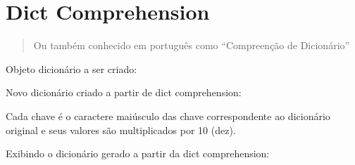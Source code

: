 \documentclass[letterpaper,10pt,brazil]{sphinxmanual}
\begin{document}
\section{Dict Comprehension}
\label{\detokenize{content/sequences:dict-comprehension}}\begin{quote}

Ou também conhecido em português como “Compreenção de Dicionário”
\end{quote}

Objeto dicionário a ser criado:

\begin{sphinxVerbatim}[commandchars=\\\{\}]
      
\end{sphinxVerbatim}

Novo dicionário criado a partir de dict comprehension:

\begin{sphinxVerbatim}[commandchars=\\\{\}]
          
\end{sphinxVerbatim}

Cada chave é o caractere maiúsculo das chave correspondente ao dicionário
original e seus valores são multiplicados por 10 (dez).

Exibindo o dicionário gerado a partir da dict comprehension:

\begin{sphinxVerbatim}[commandchars=\\\{\}]
\end{sphinxVerbatim}

\begin{sphinxVerbatim}[commandchars=\\\{\}]
\end{sphinxVerbatim}
\end{document}
